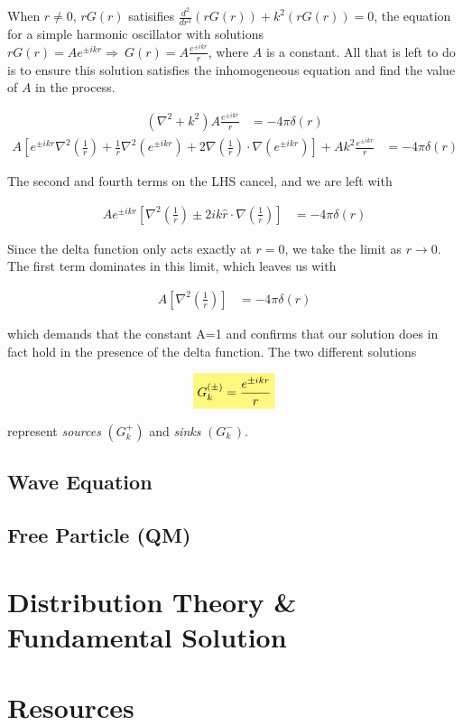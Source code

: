 \documentclass[11pt]{article}
\theoremstyle{plain}
\theoremstyle{definition}
\newcommand{\highlight}[1]{%
  \colorbox{yellow!50}{$\displaystyle#1$}}
\begin{document}
When $r \neq 0$, $rG(r)$ satisifies $ \frac{d^2}{dr^2} \left( rG(r) \right) + k^2 \left( rG(r)  \right) = 0$, the equation for a simple harmonic oscillator with solutions $rG(r) = A e^{\pm ikr} \Rightarrow \ G(r) = A \frac{e^{\pm ikr}}{r}$, where $A$ is a constant.  All that is left to do is to ensure this solution satisfies the inhomogeneous equation and find the value of $A$ in the process.

\begin{align}
    \left( \nabla^2+k^2 \right) A \frac{e^{\pm ikr}}{r} &= -4\pi \delta(r)
\end{align}
\begin{align}
    A \left[ e^{\pm ikr} \nabla^2 \left(\frac{1}{r}\right) + \frac{1}{r} \nabla^2 \left( e^{\pm ikr}  \right) + 2 \nabla \left( \frac{1}{r} \right) \cdot \nabla \left( e^{\pm ikr} \right) \right] + A k^2 \frac{e^{\pm ikr}}{r} &= -4\pi \delta(r)
\end{align}

The second and fourth terms on the LHS cancel, and we are left with

\begin{align}
    A e^{\pm ikr} \left[ \nabla^2 \left(\frac{1}{r}\right) \pm 2ik  \hat r \cdot \nabla \left( \frac{1}{r} \right) \right] &= -4\pi \delta(r)
\end{align}

Since the delta function only acts exactly at $r=0$, we take the limit as $r \rightarrow 0$. The first term dominates in this limit, which leaves us with

\begin{align}
    A \left[ \nabla^2 \left(\frac{1}{r}\right) \right] &= -4\pi \delta(r)
\end{align}

which demands that the constant A=1 and confirms that our solution does in fact hold in the presence of the delta function. The two different solutions

\begin{align}
    \highlight{ G_k^{\left( \pm \right)} = \frac{e^{\pm ikr}}{r} }
\end{align}

represent \textit{sources} $\left( G_k^+ \right)$ and \textit{sinks} $\left( G_k^- \right)$.






\subsection{Wave Equation}
\subsection{Free Particle (QM)}

\section{Distribution Theory \& Fundamental Solution}
\section{Resources}
\end{document}
